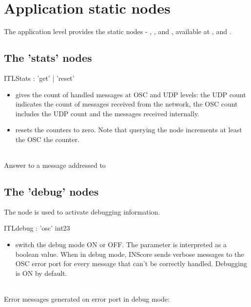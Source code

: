 \documentclass[a4paper,twoside]{report}
\newcommand{\sublevel}[1]	{\section{#1}}
\newcommand{\subsublevel}[1]	{\subsection{#1}}
\begin{document}
\sublevel{Application static nodes}
\label{ITLStatic}

The application level provides the static nodes - , ,  and , available at  ,  and . 

\subsublevel{The 'stats' nodes}
\label{ITLstat}


\begin{rail}
ITLStats : 'get'  | 'reset'
\end{rail}

\begin{itemize}
\item {} gives the count of handled messages at OSC and UDP levels: the UDP count indicates the count of messages received from the network, the OSC count includes the UDP count and the messages received internally.
\item {} resets the counters to zero. Note that querying the  node increments at least the OSC the counter.
\end{itemize}

\example \\
Answer to a  message addressed to 


\subsublevel{The 'debug' nodes}
\label{ITLdebug}

The  node is used to activate debugging information.


\begin{rail}
ITLdebug : 'osc' int23
\end{rail}

\begin{itemize}
\item switch the debug mode ON or OFF. The parameter is interpreted as a boolean value. When in debug mode, INScore sends verbose messages to the OSC error port for every message that can't be correctly handled. Debugging is ON by default.
\end{itemize}

\example \\
Error messages generated on error port in debug mode:
\end{document}
